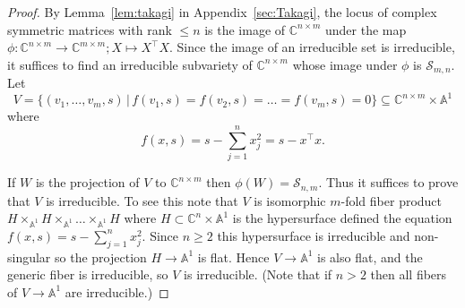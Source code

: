 \documentclass{article}
\theoremstyle{definition}
\renewcommand{\|}{|}
\renewcommand{\c}{\mathbb{C}}
\begin{document}
\begin{proof}
By Lemma~\ref{lem:takagi} in Appendix~\ref{sec:Takagi}, the locus of complex symmetric matrices with rank $\leq n$ is the image of $\c^{n\times m}$ under the map $\phi\colon \c^{n \times m} \to \c^{m \times m}; X \mapsto X^\top X$. Since the image of an irreducible set is irreducible, it suffices to find an irreducible subvariety of $\c^{n\times m}$ whose image under $\phi$ is $\mathcal{S}_{m,n}$. 
Let
$$V = \{(v_1,\dots, v_{m}, s) \, | \, f(v_1, s) = f(v_2,s) = \dots = f(v_{m},s) = 0\} \subseteq \c^{n\times m} \times \mathbb{A}^1$$
where $$f(x, s) = s-\sum_{j=1}^n x_{j}^2 = s-x^\top x.$$

If $W$ is the projection of $V$ to $\c^{n \times m}$ then $\phi(W) = \mathcal{S}_{n,m}$.
Thus it suffices to prove that $V$ is irreducible. To see this note that $V$ is isomorphic $m$-fold fiber product $H \times_{\mathbb{A}^1} H \times_{\mathbb{A}^1} \ldots \times_{\mathbb{A}^1} H$
where $H \subset \c^n \times \mathbb{A}^1$ is the hypersurface defined the equation $f(x,s) = s - \sum_{j=1}^n x_j^2$. Since $n \geq 2$ this hypersurface is irreducible and non-singular so the projection $H \to \mathbb{A}^1$ is flat. Hence $V \to \mathbb{A}^1$ is also flat, and the generic fiber is irreducible, so $V$ is irreducible. (Note that
if $n > 2$ then all fibers of $V \to \mathbb{A}^1$ are irreducible.)
\end{proof}
\end{document}
